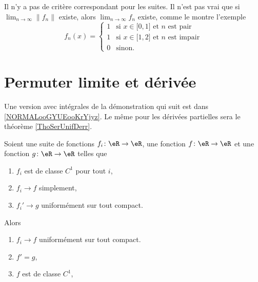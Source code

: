 \begin{remark}
	Il n'y a pas de critère correspondant pour les suites. Il n'est pas vrai que si \( \lim_{n\to \infty}\| f_n \| \) existe, alors \( \lim_{n\to \infty} f_n\) existe, comme le montre l'exemple
	\begin{equation}
		f_n(x)=\begin{cases}
			1 & \text{si } x\in\mathopen[ 0 , 1 \mathclose]\text{ et } n\text{ est pair}   \\
			1 & \text{si } x\in\mathopen[ 1 , 2 \mathclose]\text{ et } n\text{ est impair} \\
			0 & \text{sinon.}
		\end{cases}
	\end{equation}
\end{remark}

\section{Permuter limite et dérivée}

Une version avec intégrales de la démonstration qui suit est dans \ref{NORMALooGYUEooKrYjyz}. Le même pour les dérivées partielles sera le théorème  \ref{ThoSerUnifDerr}.
\begin{theorem}     \label{THOooXZQCooSRteSr}
	Soient une suite de fonctions \( f_i\colon \eR\to \eR\), une fonction \( f\colon \eR\to \eR\) et une fonction \( g\colon \eR\to \eR\) telles que
	\begin{enumerate}
		\item
		      \( f_i\) est de classe \( C^1\) pour tout \( i\),
		\item
		      \( f_i\to f\) simplement,
		\item
		      \( f_i'\to g\) uniformément sur tout compact.
	\end{enumerate}
	Alors
	\begin{enumerate}
		\item       \label{ITEMooYSWDooFFeQCd}
		      \( f_i\to f\) uniformément sur tout compact.
		\item       \label{ITEMooFAWUooVQJPZh}
		      \( f'=g\),
		\item
		      \( f\) est de classe \( C^1\),
	\end{enumerate}
\end{theorem}

